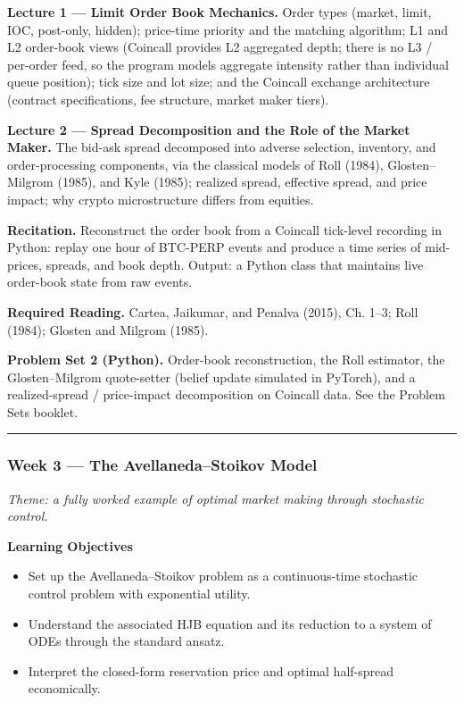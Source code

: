 \documentclass[
]{article}
\providecommand{\tightlist}{%
  \setlength{\itemsep}{0pt}\setlength{\parskip}{0pt}}
\begin{document}
\textbf{Lecture 1 --- Limit Order Book Mechanics.} Order types (market,
limit, IOC, post-only, hidden); price-time priority and the matching
algorithm; L1 and L2 order-book views (Coincall provides L2 aggregated
depth; there is no L3 / per-order feed, so the program models aggregate
intensity rather than individual queue position); tick size and lot
size; and the Coincall exchange architecture (contract specifications,
fee structure, market maker tiers).

\textbf{Lecture 2 --- Spread Decomposition and the Role of the Market
Maker.} The bid-ask spread decomposed into adverse selection, inventory,
and order-processing components, via the classical models of Roll
(1984), Glosten--Milgrom (1985), and Kyle (1985); realized spread,
effective spread, and price impact; why crypto microstructure differs
from equities.

\textbf{Recitation.} Reconstruct the order book from a Coincall
tick-level recording in Python: replay one hour of BTC-PERP events and
produce a time series of mid-prices, spreads, and book depth. Output: a
Python class that maintains live order-book state from raw events.

\textbf{Required Reading.} Cartea, Jaikumar, and Penalva (2015), Ch.
1--3; Roll (1984); Glosten and Milgrom (1985).

\textbf{Problem Set 2 (Python).} Order-book reconstruction, the Roll
estimator, the Glosten--Milgrom quote-setter (belief update simulated in
PyTorch), and a realized-spread / price-impact decomposition on Coincall
data. See the Problem Sets booklet.

\begin{center}\rule{0.5\linewidth}{0.5pt}\end{center}

\subsubsection{Week 3 --- The Avellaneda--Stoikov
Model}\label{week-3-the-avellanedastoikov-model}

\emph{Theme: a fully worked example of optimal market making through
stochastic control.}

\textbf{Learning Objectives}

\begin{itemize}
\tightlist
\item
  Set up the Avellaneda--Stoikov problem as a continuous-time stochastic
  control problem with exponential utility.
\item
  Understand the associated HJB equation and its reduction to a system
  of ODEs through the standard ansatz.
\item
  Interpret the closed-form reservation price and optimal half-spread
  economically.
\end{itemize}
\end{document}
